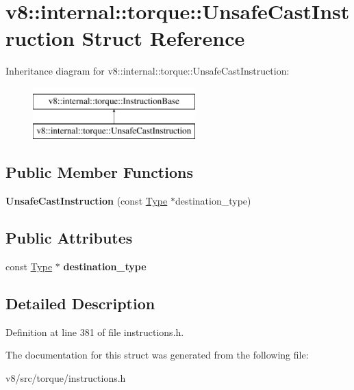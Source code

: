 \hypertarget{structv8_1_1internal_1_1torque_1_1UnsafeCastInstruction}{}\section{v8\+:\+:internal\+:\+:torque\+:\+:Unsafe\+Cast\+Instruction Struct Reference}
\label{structv8_1_1internal_1_1torque_1_1UnsafeCastInstruction}
Inheritance diagram for v8\+:\+:internal\+:\+:torque\+:\+:Unsafe\+Cast\+Instruction\+:\begin{figure}[H]
\begin{center}
\leavevmode
\includegraphics[height=2.000000cm]{structv8_1_1internal_1_1torque_1_1UnsafeCastInstruction}
\end{center}
\end{figure}
\subsection*{Public Member Functions}
\begin{DoxyCompactItemize}
\item 
\mbox{\label{structv8_1_1internal_1_1torque_1_1UnsafeCastInstruction_a5ca786a058a64077aa625a6e26ab9388}} 
{\bfseries Unsafe\+Cast\+Instruction} (const \mbox{\hyperlink{classv8_1_1internal_1_1torque_1_1Type}{Type}} $\ast$destination\+\_\+type)
\end{DoxyCompactItemize}
\subsection*{Public Attributes}
\begin{DoxyCompactItemize}
\item 
\mbox{\label{structv8_1_1internal_1_1torque_1_1UnsafeCastInstruction_a2ff91d066997f97e77c4e66b754b5a9e}} 
const \mbox{\hyperlink{classv8_1_1internal_1_1torque_1_1Type}{Type}} $\ast$ {\bfseries destination\+\_\+type}
\end{DoxyCompactItemize}


\subsection{Detailed Description}


Definition at line 381 of file instructions.\+h.



The documentation for this struct was generated from the following file\+:\begin{DoxyCompactItemize}
\item 
v8/src/torque/instructions.\+h\end{DoxyCompactItemize}

